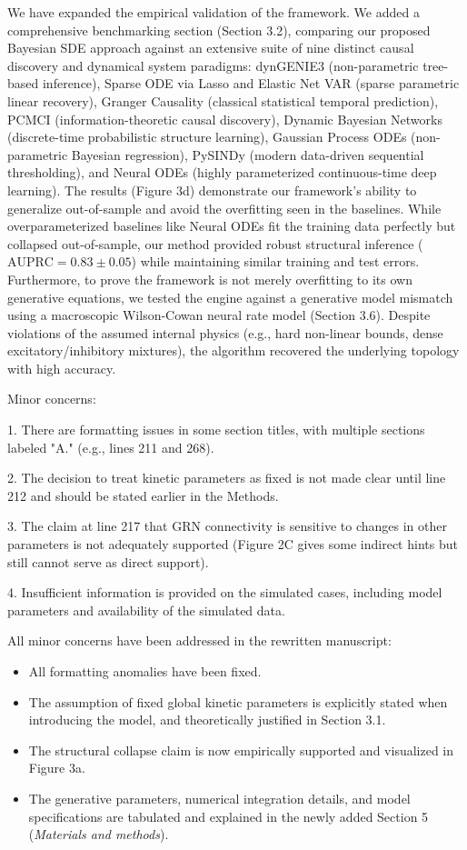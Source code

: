 \documentclass[11pt,a4paper]{article}
\begin{document}
We have expanded the empirical validation of the framework. We added a comprehensive benchmarking section (Section 3.2), comparing our proposed Bayesian SDE approach against an extensive suite of nine distinct causal discovery and dynamical system paradigms: dynGENIE3 (non-parametric tree-based inference), Sparse ODE via Lasso and Elastic Net VAR (sparse parametric linear recovery), Granger Causality (classical statistical temporal prediction), PCMCI (information-theoretic causal discovery), Dynamic Bayesian Networks (discrete-time probabilistic structure learning), Gaussian Process ODEs (non-parametric Bayesian regression), PySINDy (modern data-driven sequential thresholding), and Neural ODEs (highly parameterized continuous-time deep learning). The results (Figure 3d) demonstrate our framework's ability to generalize out-of-sample and avoid the overfitting seen in the baselines. While overparameterized baselines like Neural ODEs fit the training data perfectly but collapsed out-of-sample, our method provided robust structural inference ($\text{AUPRC} = 0.83 \pm 0.05$) while maintaining similar training and test errors.
Furthermore, to prove the framework is not merely overfitting to its own generative equations, we tested the engine against a generative model mismatch using a macroscopic Wilson-Cowan neural rate model (Section 3.6). Despite violations of the assumed internal physics (e.g., hard non-linear bounds, dense excitatory/inhibitory mixtures), the algorithm recovered the underlying topology with high accuracy.

\begin{reviewercomment}
Minor concerns:

1. There are formatting issues in some section titles, with multiple sections labeled "A." (e.g., lines 211 and 268).

2. The decision to treat kinetic parameters as fixed is not made clear until line 212 and should be stated earlier in the Methods.

3. The claim at line 217 that GRN connectivity is sensitive to changes in other parameters is not adequately supported (Figure 2C gives some indirect hints but still cannot serve as direct support).

4. Insufficient information is provided on the simulated cases, including model parameters and availability of the simulated data.
\end{reviewercomment}

All minor concerns have been addressed in the rewritten manuscript:
\begin{itemize}
    \item All formatting anomalies have been fixed. 
    \item The assumption of fixed global kinetic parameters is explicitly stated when introducing the model, and theoretically justified in Section 3.1. 
    \item The structural collapse claim is now empirically supported and visualized in Figure 3a. 
    \item The generative parameters, numerical integration details, and model specifications are tabulated and explained in the newly added Section 5 (\textit{Materials and methods}).
\end{itemize}
\end{document}
